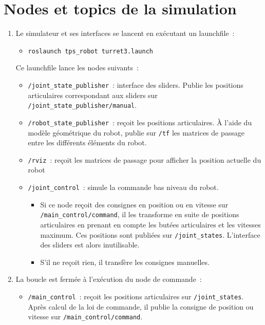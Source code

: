\documentclass[12pt,a4paper]{article}
\begin{document}
\section{Nodes et topics de la simulation}
\label{sec:nodes}
\begin{enumerate}
\item Le simulateur et ses interfaces se lancent en exécutant un launchfile~:
\begin{itemize}
\item \texttt{roslaunch tps\_robot turret3.launch}
\end{itemize}
Ce launchfile lance les nodes suivants~:
\begin{itemize}
\item \texttt{/joint\_state\_publisher}~: interface des sliders. Publie les positions articulaires correspondant aux sliders sur \texttt{/joint\_state\_publisher/manual}.
\item \texttt{/robot\_state\_publisher}~: reçoit les positions articulaires. À l'aide du modèle géométrique du robot, publie sur \texttt{/tf} les  matrices de passage entre les différents éléments du robot.
\item \texttt{/rviz}~: reçoit les matrices de passage pour afficher la position actuelle du robot
\item \texttt{/joint\_control}~: simule la commande bas niveau du robot.
\begin{itemize}
\item Si ce node reçoit des consignes en position ou en vitesse sur \texttt{/main\_control/command}, il les transforme en suite de positions articulaires en prenant en compte les butées articulaires et les vitesses maximum. 
Ces positions sont publiées sur \texttt{/joint\_states}. L'interface des sliders est alors inutilisable. 
\item S'il ne reçoit rien, il transfère les consignes manuelles. 
\end{itemize}
\end{itemize}
\item La boucle est fermée à l'exécution du node de commande~:
\begin{itemize}
\item \texttt{/main\_control}~: reçoit les positions articulaires sur \texttt{/joint\_states}. Après calcul de la loi de commande, il publie la consigne de position ou vitesse sur \linebreak \texttt{/main\_control/command}.
\end{itemize}

\end{enumerate}
\end{document}
